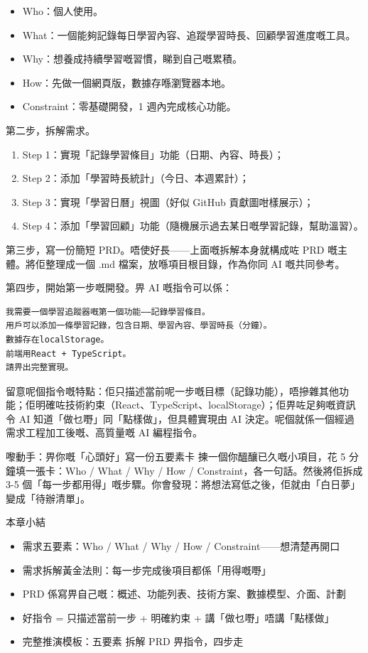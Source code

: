 \begin{itemize}
  \item Who：個人使用。
  \item What：一個能夠記錄每日學習內容、追蹤學習時長、回顧學習進度嘅工具。
  \item Why：想養成持續學習嘅習慣，睇到自己嘅累積。
  \item How：先做一個網頁版，數據存喺瀏覽器本地。
  \item Constraint：零基礎開發，1 週內完成核心功能。
\end{itemize}

第二步，拆解需求。

\begin{enumerate}
  \item Step 1：實現「記錄學習條目」功能（日期、內容、時長）；
  \item Step 2：添加「學習時長統計」（今日、本週累計）；
  \item Step 3：實現「學習日曆」視圖（好似 GitHub 貢獻圖咁樣展示）；
  \item Step 4：添加「學習回顧」功能（隨機展示過去某日嘅學習記錄，幫助溫習）。
\end{enumerate}

第三步，寫一份簡短 PRD。唔使好長——上面嘅拆解本身就構成咗 PRD 嘅主體。將佢整理成一個 .md 檔案，放喺項目根目錄，作為你同 AI 嘅共同參考。

第四步，開始第一步嘅開發。畀 AI 嘅指令可以係：

\begin{lstlisting}
我需要一個學習追蹤器嘅第一個功能——記錄學習條目。
用戶可以添加一條學習記錄，包含日期、學習內容、學習時長（分鐘）。
數據存在localStorage。
前端用React + TypeScript。
請畀出完整實現。
\end{lstlisting}

留意呢個指令嘅特點：佢只描述當前呢一步嘅目標（記錄功能），唔摻雜其他功能；佢明確咗技術約束（React、TypeScript、localStorage）；佢畀咗足夠嘅資訊令 AI 知道「做乜嘢」同「點樣做」，但具體實現由 AI 決定。呢個就係一個經過需求工程加工後嘅、高質量嘅 AI 編程指令。

\begin{tcbpractice}{嚟動手：畀你嘅「心頭好」寫一份五要素卡}
揀一個你醞釀已久嘅小項目，花 5 分鐘填一張卡：Who / What / Why / How / Constraint，各一句話。然後將佢拆成 3-5 個「每一步都用得」嘅步驟。你會發現：將想法寫低之後，佢就由「白日夢」變成「待辦清單」。

\end{tcbpractice}

\begin{tcbsummary}{本章小結}
\begin{itemize}
  \item 需求五要素：Who / What / Why / How / Constraint——想清楚再開口
  \item 需求拆解黃金法則：每一步完成後項目都係「用得嘅嘢」
  \item PRD 係寫畀自己嘅：概述、功能列表、技術方案、數據模型、介面、計劃
  \item 好指令 = 只描述當前一步 + 明確約束 + 講「做乜嘢」唔講「點樣做」
  \item 完整推演模板：五要素 拆解 PRD 畀指令，四步走
\end{itemize}

\end{tcbsummary}
